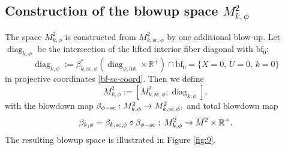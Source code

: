 \documentclass[11pt]{article}
\numberwithin{equation}{section}
\newcommand{\intt}{\mathrm{int}}
\newcommand{\phisc}{{\phi\textup{-}\ssc}}
\theoremstyle{plain}
\theoremstyle{definition}
\newcommand{\R}{{\mathbb{R}}}
\newcommand{\bbf}{{\mathrm{bf}}}
\newcommand{\bfz}{{\bbf_0}}
\newcommand{\ssc}{{\mathrm{sc}}}
\DeclareMathOperator\diag{diag}
\newcommand{\Mbar}{{\overline{M}}}\let\M\Mbar
\begin{document}
\subsection{Construction of the blowup space $M^{2}_{k,\phi}$}
The space $M^{2}_{k,\phi}$ is constructed from $M^{2}_{k, \ssc,\phi}$
by one additional blow-up. Let $\diag_{k,\phi}$ be the intersection of the lifted interior fiber diagonal with $\bfz$:
\begin{equation}
\label{eqn:def diag k phi}
\diag_{k,\phi} := \beta_{k,\ssc,\phi}^*(\diag_{\phi,\intt}\times\R^+) \cap \bbf_0 = \{ X=0,\, U=0,\, k=0\}
\end{equation}
in projective coordinates
\eqref{bf-sc-coord}.
Then we define
\begin{equation}
M^{2}_{k,\phi} := [ M^{2}_{k, \ssc,\phi} ; \diag_{k,\phi}],
\end{equation}
with the blowdown map $\beta_{ \phisc} : M^{2}_{k, \phi} \to M^{2}_{k, \ssc,\phi},$ and total blowdown map
\begin{equation*}
\beta_{k, \phi} = \beta_{k, \ssc,\phi} \circ \beta_{\phisc} :\,
M^{2}_{k,\phi} \to \Mbar{}^{2} \times \R^+.
\end{equation*}
The resulting blowup space is illustrated in Figure \ref{fig:9}.
\end{document}
